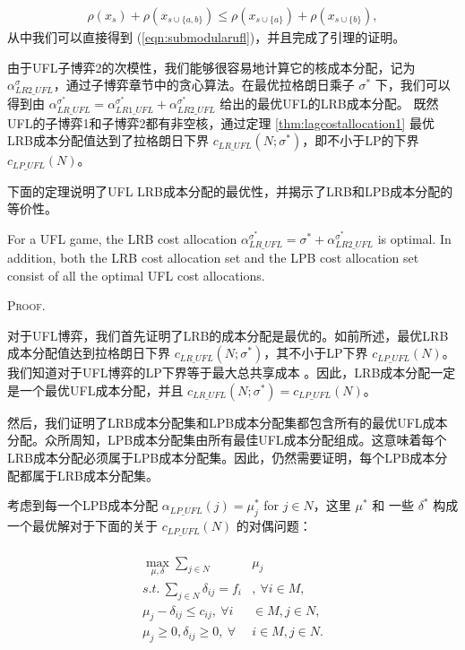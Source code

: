 \documentclass[UTF8]{article}
\begin{document}
\begin{定义}
\begin{eqnarray*}
  \rho(x_s) + \rho(x_{s\cup \{a,b\}}) \leq \rho(x_{s\cup\{a\}}) + \rho(x_{s\cup \{b\}}),
\end{eqnarray*}
从中我们可以直接得到 (\ref{eqn:submodularufl})，并且完成了引理的证明。
\hfill\Halmos

由于UFL子博弈2的次模性，我们能够很容易地计算它的核成本分配，记为 $\alpha_{LR2\_UFL}^{\sigma}$，通过子博弈章节中的贪心算法。在最优拉格朗日乘子 $\sigma^*$ 下，我们可以得到由 $\alpha_{LR\_UFL}^{\sigma^*} = \alpha_{LR1\_UFL}^{\sigma^*} + \alpha_{LR2\_UFL}^{\sigma^*}$ 给出的最优UFL的LRB成本分配。
既然UFL的子博弈1和子博弈2都有非空核，通过定理 \ref{thm:lagcostallocation1} 最优LRB成本分配值达到了拉格朗日下界 $c_{LR\_UFL}(N;\sigma^*)$，即不小于LP的下界 $c_{LP\_UFL}(N)$。

下面的定理说明了UFL LRB成本分配的最优性，并揭示了LRB和LPB成本分配的等价性。

\begin{theorem}\label{lemma:lpbequallrbufl}
For a UFL game, the LRB cost allocation $\alpha_{LR\_UFL}^{\sigma^*} = \sigma^* + \alpha_{LR2\_UFL}^{\sigma^*}$ is optimal. In addition, both the LRB cost allocation set and the LPB cost allocation set consist of all the optimal UFL cost allocations.
\end{theorem}
{\scshape Proof.}

对于UFL博弈，我们首先证明了LRB的成本分配是最优的。如前所述，最优LRB成本分配值达到拉格朗日下界 $c_{LR\_UFL}(N;\sigma^*)$，其不小于LP下界 $c_{LP\_UFL}(N)$。
我们知道对于UFL博弈的LP下界等于最大总共享成本 \citep{Kolen1983FacilityLocationGame,Goemans2000FacilityLocationGames}。因此，LRB成本分配一定是一个最优UFL成本分配，并且 $c_{LR\_UFL}(N;\sigma^*)=c_{LP\_UFL}(N)$。

然后，我们证明了LRB成本分配集和LPB成本分配集都包含所有的最优UFL成本分配。众所周知，LPB成本分配集由所有最佳UFL成本分配\citep{Goemans2000FacilityLocationGames}组成。这意味着每个LRB成本分配必须属于LPB成本分配集。因此，仍然需要证明，每个LPB成本分配都属于LRB成本分配集。

考虑到每一个LPB成本分配 $\alpha_{LP\_UFL}(j)=\mu^*_j$ for $j \in N$，这里 $\mu^*$ 和 一些 $\delta^*$ 构成一个最优解对于下面的关于 $c_{LP\_UFL}(N)$ 的对偶问题：

\begin{eqnarray*}
\begin{aligned}
\begin{split}\label{eqn:UFLLRdual1}
 \max_{\mu,\delta} \sum_{j \in N}&\mu_j\\
s.t.~\sum_{j \in N}\delta_{ij} = f_i&, ~\forall i \in M,\\
\mu_j - \delta_{ij} \leq c_{ij}, ~\forall i& \in M, j \in N,\\
 \mu_j \geq 0, \delta_{ij} \geq 0,~\forall &i \in M, j \in N.
\end{split}
\end{aligned}
\end{eqnarray*}


\end{定义}
\end{document}
